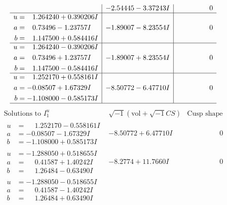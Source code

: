\documentclass[1p]{elsarticle_modified}
\theoremstyle{definition}
\newcommand{\I}{\sqrt{-1}}
\begin{document}
$$\begin{array}{c|c|c}
 & -2.54445 - 3.37243 I & \phantom{-0.000000 } 0 \\ \hline\begin{aligned}
u &= \phantom{-}1.264240 + 0.390206 I \\
a &= \phantom{-}0.73496 - 1.23757 I \\
b &= \phantom{-}1.147500 + 0.584416 I\end{aligned}
 & -1.89007 - 8.23554 I & \phantom{-0.000000 } 0 \\ \hline\begin{aligned}
u &= \phantom{-}1.264240 - 0.390206 I \\
a &= \phantom{-}0.73496 + 1.23757 I \\
b &= \phantom{-}1.147500 - 0.584416 I\end{aligned}
 & -1.89007 + 8.23554 I & \phantom{-0.000000 } 0 \\ \hline\begin{aligned}
u &= \phantom{-}1.252170 + 0.558161 I \\
a &= -0.08507 + 1.67329 I \\
b &= -1.108000 - 0.585173 I\end{aligned}
 & -8.50772 - 6.47710 I & \phantom{-0.000000 } 0\\
 \hline 
 \end{array}$$\newpage$$\begin{array}{c|c|c}  
\text{Solutions to }I^u_{1}& \I (\text{vol} + \sqrt{-1}CS) & \text{Cusp shape}\\
 \hline 
\begin{aligned}
u &= \phantom{-}1.252170 - 0.558161 I \\
a &= -0.08507 - 1.67329 I \\
b &= -1.108000 + 0.585173 I\end{aligned}
 & -8.50772 + 6.47710 I & \phantom{-0.000000 } 0 \\ \hline\begin{aligned}
u &= -1.288050 + 0.518655 I \\
a &= \phantom{-}0.41587 + 1.40242 I \\
b &= \phantom{-}1.26484 - 0.63490 I\end{aligned}
 & -8.2774 + 11.7660 I & \phantom{-0.000000 } 0 \\ \hline\begin{aligned}
u &= -1.288050 - 0.518655 I \\
a &= \phantom{-}0.41587 - 1.40242 I \\
b &= \phantom{-}1.26484 + 0.63490 I\end{aligned}

\end{array}$$
\end{document}
